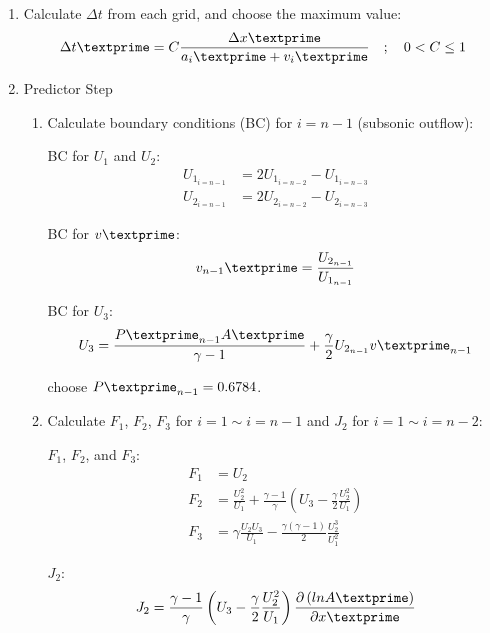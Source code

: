 \documentclass[12pt]{article}
\begin{document}
\begin{enumerate}
\begin{enumerate}
		\item Calculate $\Delta t$ from each grid, and choose the maximum value:
			\begin{equation}
				\Delta t\textprime = C\frac{\Delta x\textprime}{a_{i}\textprime + v_{i}\textprime}\hspace{1em};\hspace{1em}0 < C \leq 1
			\end{equation}
		\item Predictor Step
		\begin{enumerate}
			\item Calculate boundary conditions (BC) for $i = n-1$ (subsonic outflow):
				\par BC for $U_{1}$ and $U_{2}$:
				\begin{align}
					U_{1_{i=n-1}} &= 2U_{1_{i=n-2}} - U_{1_{i=n-3}} \\
					U_{2_{i=n-1}} &= 2U_{2_{i=n-2}} - U_{2_{i=n-3}}
				\end{align}
				\par BC for $v\textprime$:
				\begin{equation}
					v_{n-1}\textprime = \frac{U_{2_{n-1}}}{U_{1_{n-1}}}
				\end{equation}
				\par BC for $U_{3}$:
				\begin{equation}
					U_{3} 	= \frac{P\textprime_{n-1}A\textprime}{\gamma - 1} + \frac{\gamma}{2}U_{2_{n-1}}v\textprime_{n-1} \\
				\end{equation}
				\par choose $P\textprime_{n-1} = 0.6784$.
			\item Calculate $F_{1}$, $F_{2}$, $F_{3}$ for $i = 1 \sim i = n - 1$ and $J_{2}$ for $i = 1 \sim i = n - 2$:
				\par $F_{1}$, $F_{2}$, and $F_{3}$:
				\begin{align}
					F_{1}	&= U_{2} \\
					F_{2}	&= \frac{U_{2}^{2}}{U_{1}} + \frac{\gamma - 1}{\gamma}\left(U_{3} - \frac{\gamma}{2}\frac{U_{2}^{2}}{U_{1}}\right) \\
					F_{3}	&= \gamma\frac{U_{2}U_{3}}{U_{1}} - \frac{\gamma\left(\gamma - 1\right)}{2}\frac{U_{2}^{3}}{U_{1}^{2}}
				\end{align}
				\par $J_{2}$:
				\begin{align}
					J_{2} 	&= \frac{\gamma - 1}{\gamma}\left(U_{3} - \frac{\gamma}{2}\frac{U_{2}^{2}}{U_{1}}\right)\frac{\partial\left(ln A\textprime\right)}{\partial x\textprime} \\

\end{align}
\end{enumerate}
\end{enumerate}
\end{enumerate}
\end{document}
